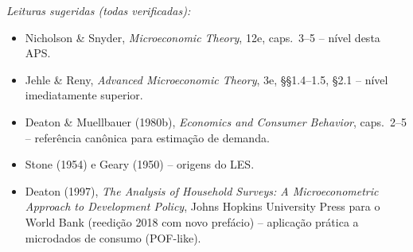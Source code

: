 \documentclass[11pt,addpoints]{exam}
\begin{document}
\vspace{1em}
\begin{contextbox}
\small
\textit{Leituras sugeridas (todas verificadas):}
\begin{itemize}[noitemsep,topsep=0pt]
\item Nicholson \& Snyder, \textit{Microeconomic Theory}, 12e, caps.\ 3--5 -- nível desta APS.
\item Jehle \& Reny, \textit{Advanced Microeconomic Theory}, 3e, §§1.4--1.5, §2.1 -- nível imediatamente superior.
\item Deaton \& Muellbauer (1980b), \textit{Economics and Consumer Behavior}, caps.\ 2--5 -- referência canônica para estimação de demanda.
\item Stone (1954) e Geary (1950) -- origens do LES.
\item Deaton (1997), \textit{The Analysis of Household Surveys: A Microeconometric Approach to Development Policy}, Johns Hopkins University Press para o World Bank (reedição 2018 com novo prefácio) -- aplicação prática a microdados de consumo (POF-like).
\end{itemize}
\end{contextbox}
\end{document}
